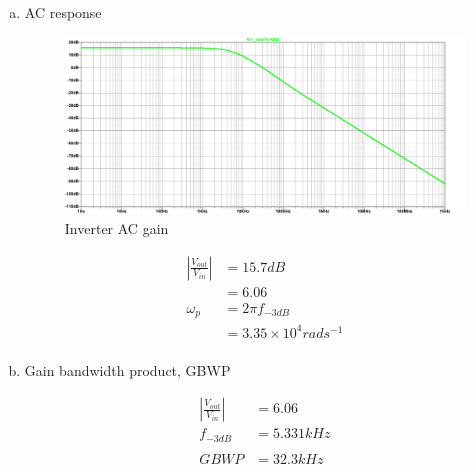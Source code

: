 \documentclass{article}
\begin{document}
\begin{enumerate}[(a)]
\item AC response

\begin{figure}[H]
\centering
\includegraphics[width=.9\linewidth]{img/q4/gain-c.pdf}
\caption{\label{fig:gain-c-q3}Inverter AC gain}
\end{figure}

\begin{equation*}
\begin{aligned}
|\frac{V_{out}}{V_{in}}| &= 15.7 dB \\
&= 6.06 \\
\omega_{p} &= 2\pi{}f_{-3dB} \\
&= 3.35 \times 10^{4} rad s^{-1} \\
\end{aligned}
\end{equation*}

\item Gain bandwidth product, GBWP

\begin{equation*}
\begin{aligned}
|\frac{V_{out}}{V_{in}}| &= 6.06 \\
f_{-3dB} &= 5.331 kHz \\
\\
GBWP &= 32.3 kHz \\
\end{aligned}
\end{equation*}
\end{enumerate}
\end{document}
